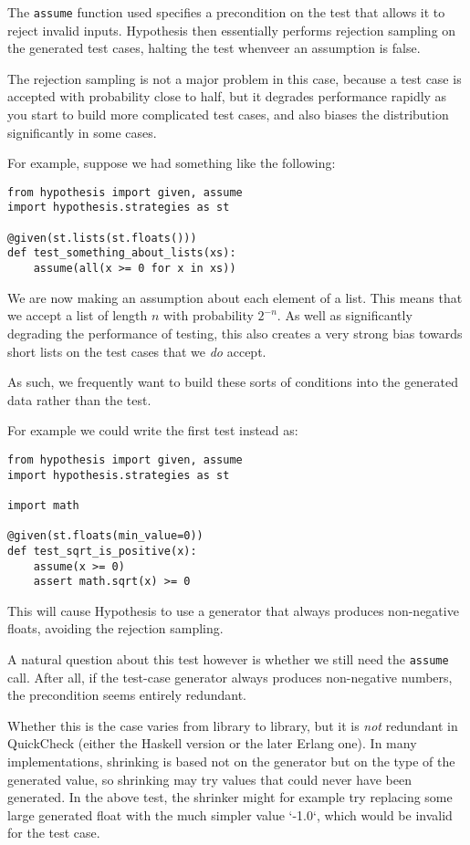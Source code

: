 The \texttt{assume} function used specifies a precondition on the test that allows it to reject invalid inputs.
Hypothesis then essentially performs rejection sampling on the generated test cases,
halting the test whenveer an assumption is false.

The rejection sampling is not a major problem in this case,
because a test case is accepted with probability close to half,
but it degrades performance rapidly as you start to build more complicated test cases,
and also biases the distribution significantly in some cases.

For example,
suppose we had something like the following:

\begin{lstlisting}
from hypothesis import given, assume
import hypothesis.strategies as st

@given(st.lists(st.floats()))
def test_something_about_lists(xs):
    assume(all(x >= 0 for x in xs))
\end{lstlisting}

We are now making an assumption about each element of a list.
This means that we accept a list of length \(n\) with probability \(2^{-n}\).
As well as significantly degrading the performance of testing,
this also creates a very strong bias towards short lists on the test cases that we \emph{do} accept.

As such,
we frequently want to build these sorts of conditions into the generated data rather than the test.

For example we could write the first test instead as:

\begin{lstlisting}
from hypothesis import given, assume
import hypothesis.strategies as st

import math

@given(st.floats(min_value=0))
def test_sqrt_is_positive(x):
    assume(x >= 0)
    assert math.sqrt(x) >= 0
\end{lstlisting}

This will cause Hypothesis to use a generator that always produces non-negative floats,
avoiding the rejection sampling.

A natural question about this test however is whether we still need the \texttt{assume} call.
After all,
if the test-case generator always produces non-negative numbers,
the precondition seems entirely redundant.

Whether this is the case varies from library to library,
but it is \emph{not} redundant in QuickCheck (either the Haskell version or the later Erlang one).
In many implementations,
shrinking is based not on the generator but on the type of the generated value,
so shrinking may try values that could never have been generated.
In the above test,
the shrinker might for example try replacing some large generated float with the much simpler value `-1.0`,
which would be invalid for the test case.

